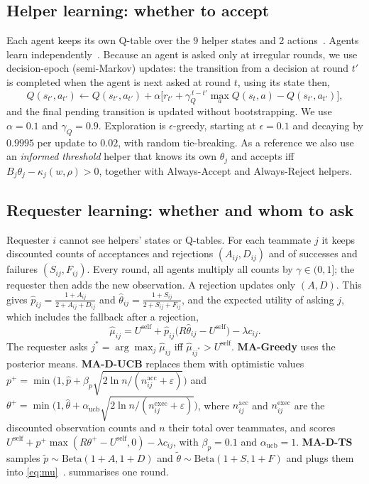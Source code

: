 \documentclass{article}
\newcommand{\Uself}{U^{\mathrm{self}}}
\begin{document}
\subsection{Helper learning: whether to accept}
Each agent keeps its own Q-table over the 9 helper states and 2 actions~\cite{watkins1992qlearning}. Agents learn independently~\cite{tan1993multiagent,claus1998dynamics}. Because an agent is asked only at irregular rounds, we use decision-epoch (semi-Markov) updates: the transition from a decision at round $t'$ is completed when the agent is next asked at round $t$, using its state then,
\begin{equation}
Q(s_{t'},a_{t'})\leftarrow Q(s_{t'},a_{t'})+\alpha\big[r_{t'}+\gamma_Q^{\,t-t'}\max_a Q(s_t,a)-Q(s_{t'},a_{t'})\big],
\end{equation}
and the final pending transition is updated without bootstrapping. We use $\alpha=0.1$ and $\gamma_Q=0.9$. Exploration is $\epsilon$-greedy, starting at $\epsilon=0.1$ and decaying by $0.9995$ per update to $0.02$, with random tie-breaking. As a reference we also use an \emph{informed threshold} helper that knows its own $\theta_j$ and accepts iff $B_j\theta_j-\kappa_j(w,\rho)>0$, together with Always-Accept and Always-Reject helpers.

\subsection{Requester learning: whether and whom to ask}
Requester $i$ cannot see helpers' states or Q-tables. For each teammate $j$ it keeps discounted counts of acceptances and rejections $(A_{ij},D_{ij})$ and of successes and failures $(S_{ij},F_{ij})$. Every round, all agents multiply all counts by $\gamma\in(0,1]$; the requester then adds the new observation. A rejection updates only $(A,D)$. This gives
$\hat p_{ij}=\frac{1+A_{ij}}{2+A_{ij}+D_{ij}}$ and $\hat\theta_{ij}=\frac{1+S_{ij}}{2+S_{ij}+F_{ij}}$, and the expected utility of asking $j$, which includes the fallback after a rejection,
\begin{equation}
\hat\mu_{ij}=\Uself+\hat p_{ij}\big(R\hat\theta_{ij}-\Uself\big)-\lambda c_{ij}.
\label{eq:mu}
\end{equation}
The requester asks $j^*=\arg\max_j\hat\mu_{ij}$ iff $\hat\mu_{ij^*}>\Uself$. \textbf{MA-Greedy} uses the posterior means. \textbf{MA-D-UCB} replaces them with optimistic values $p^+=\min\!\big(1,\hat p+\beta_p\sqrt{2\ln n/(n^{\mathrm{acc}}_{ij}+\varepsilon)}\big)$ and $\theta^+=\min\!\big(1,\hat\theta+\alpha_{\mathrm{ucb}}\sqrt{2\ln n/(n^{\mathrm{exec}}_{ij}+\varepsilon)}\big)$, where $n^{\mathrm{acc}}_{ij}$ and $n^{\mathrm{exec}}_{ij}$ are the discounted observation counts and $n$ their total over teammates, and scores $\Uself+p^+\max(R\theta^+-\Uself,0)-\lambda c_{ij}$, with $\beta_p=0.1$ and $\alpha_{\mathrm{ucb}}=1$. \textbf{MA-D-TS} samples $\tilde p\sim\mathrm{Beta}(1+A,1+D)$ and $\tilde\theta\sim\mathrm{Beta}(1+S,1+F)$ and plugs them into \eqref{eq:mu}~\cite{agrawal2012analysis,gupta2011thompson}.  summarises one round.
\end{document}
